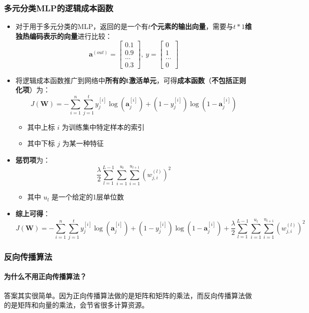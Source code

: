 \documentclass[UTF8]{ctexart}
\begin{document}
\subsubsection{多元分类MLP的逻辑成本函数}
\begin{itemize}
	\item 对于用于多元分类的MLP，返回的是一个有$t${\bfseries 个元素的输出向量}，需要与$t*1${\bfseries 维独热编码表示的向量}进行比较：
	$$\pmb a^{(out)} = \begin{bmatrix}0.1 \\ 0.9 \\ ... \\ 0.3 \end{bmatrix},\ y = \begin{bmatrix}0 \\ 1 \\ ... \\ 0 \end{bmatrix}$$
	\item 将逻辑成本函数推广到网络中{\bfseries 所有的t激活单元}，可得{\bfseries 成本函数}（{\bfseries 不包括正则化项}）为： 
	$$J(\pmb W) = - \sum_{i=1}^n\sum_{j=1}^ty_j^{[i]}\log(\pmb a^{[i]}_j) + (1-y_j^{[i]})\log(1-\pmb a^{[i]}_j)$$ \begin{itemize}
		\item 其中上标 $i$ 为训练集中特定样本的索引
		\item 其中下标 $j$ 为某一种特征
	\end{itemize}
	\item {\bfseries 惩罚项}为：
	$$\frac{\lambda}{2}\sum_{l=1}^{L-1}\sum_{i=1}^{u_l}\sum_{i=1}^{u_{l+1}}(w_{j,i}^{(l)})^2$$ \begin{itemize}
		\item 其中 $u_l$ 是一个给定的1层单位数
	\end{itemize}
	\item {\bfseries 综上可得}：$$J(\pmb W) = - \sum_{i=1}^n\sum_{j=1}^ty_j^{[i]}\log(\pmb a^{[i]}_j) + (1-y_j^{[i]})\log(1-\pmb a^{[i]}_j) + \frac{\lambda}{2}\sum_{l=1}^{L-1}\sum_{i=1}^{u_l}\sum_{i=1}^{u_{l+1}}(w_{j,i}^{(l)})^2$$
\end{itemize}

\subsubsection{反向传播算法}
\paragraph{为什么不用正向传播算法？}
答案其实很简单。因为正向传播算法做的是矩阵和矩阵的乘法，而反向传播算法做的是矩阵和向量的乘法，会节省很多计算资源。
\end{document}
